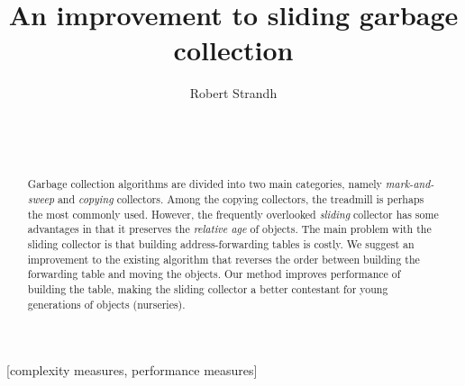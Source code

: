 \documentclass{acm_proc_article-sp}
\def\inputtex#1{}
\begin{document}
\title{An improvement to sliding garbage collection}
\author{\alignauthor
Robert Strandh\\
\\
\\
\\
}

\maketitle

\begin{abstract}
Garbage collection algorithms are divided into two main categories,
namely \emph{mark-and-sweep} and \emph{copying} collectors.  Among the
copying collectors, the treadmill is perhaps the most
commonly used.  However, the frequently overlooked \emph{sliding}
collector has some advantages in that it preserves the \emph{relative
  age} of objects.  The main problem with the sliding collector is
that building address-forwarding tables is costly.  We suggest an
improvement to the existing algorithm that reverses the order between
building the forwarding table and moving the objects.  Our method
improves performance of building the table, making the sliding
collector a better contestant for young generations of objects
(nurseries). 
\end{abstract}

[complexity measures, performance measures]

\inputtex{sec-introduction.tex}
\inputtex{sec-previous.tex}
\inputtex{sec-our-method.tex}
\inputtex{sec-conclusions.tex}



\end{document}
